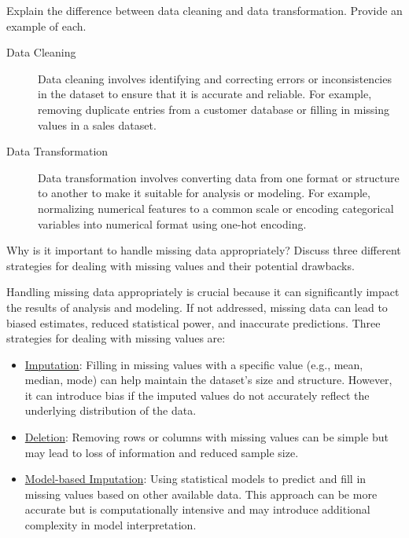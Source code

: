 \begin{ejercicio}
    Explain the difference between data cleaning and data transformation. Provide an example of each.
    \begin{description}
        \item[Data Cleaning] Data cleaning involves identifying and correcting errors or inconsistencies in the dataset to ensure that it is accurate and reliable. For example, removing duplicate entries from a customer database or filling in missing values in a sales dataset.
        \item[Data Transformation] Data transformation involves converting data from one format or structure to another to make it suitable for analysis or modeling. For example, normalizing numerical features to a common scale or encoding categorical variables into numerical format using one-hot encoding. 
    \end{description}
\end{ejercicio}

\begin{ejercicio}
    Why is it important to handle missing data appropriately? Discuss three different strategies for dealing with missing values and their potential drawbacks.

    Handling missing data appropriately is crucial because it can significantly impact the results of analysis and modeling. If not addressed, missing data can lead to biased estimates, reduced statistical power, and inaccurate predictions. Three strategies for dealing with missing values are:
\begin{itemize}
    \item \ul{Imputation}: Filling in missing values with a specific value (e.g., mean, median, mode) can help maintain the dataset's size and structure. However, it can introduce bias if the imputed values do not accurately reflect the underlying distribution of the data.
    \item \ul{Deletion}: Removing rows or columns with missing values can be simple but may lead to loss of information and reduced sample size.
    \item \ul{Model-based Imputation}: Using statistical models to predict and fill in missing values based on other available data. This approach can be more accurate but is computationally intensive and may introduce additional complexity in model interpretation.
\end{itemize}
\end{ejercicio}


